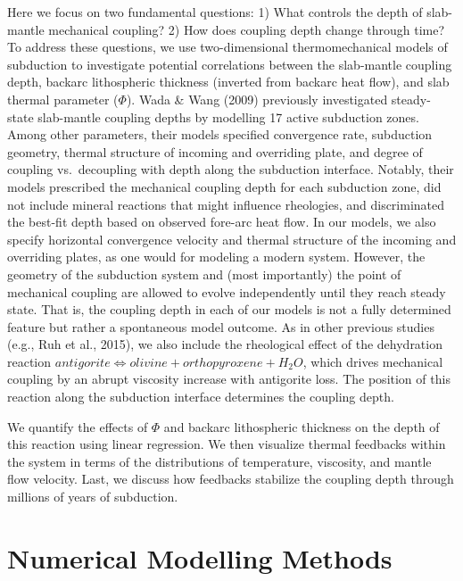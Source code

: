 \documentclass[draft,linenumbers]{agujournal2018}
\begin{document}
Here we focus on two fundamental questions: 1) What controls the depth
of slab-mantle mechanical coupling? 2) How does coupling depth change
through time? To address these questions, we use two-dimensional
thermomechanical models of subduction to investigate potential
correlations between the slab-mantle coupling depth, backarc
lithospheric thickness (inverted from backarc heat flow), and slab
thermal parameter (\(\Phi\)). Wada \& Wang (2009) previously
investigated steady-state slab-mantle coupling depths by modelling 17
active subduction zones. Among other parameters, their models specified
convergence rate, subduction geometry, thermal structure of incoming and
overriding plate, and degree of coupling vs.~decoupling with depth along
the subduction interface. Notably, their models prescribed the
mechanical coupling depth for each subduction zone, did not include
mineral reactions that might influence rheologies, and discriminated the
best-fit depth based on observed fore-arc heat flow. In our models, we
also specify horizontal convergence velocity and thermal structure of
the incoming and overriding plates, as one would for modeling a modern
system. However, the geometry of the subduction system and (most
importantly) the point of mechanical coupling are allowed to evolve
independently until they reach steady state. That is, the coupling depth
in each of our models is not a fully determined feature but rather a
spontaneous model outcome. As in other previous studies (e.g., Ruh et
al., 2015), we also include the rheological effect of the dehydration
reaction
\(antigorite \allowbreak \Leftrightarrow olivine + orthopyroxene + H_{2}O\),
which drives mechanical coupling by an abrupt viscosity increase with
antigorite loss. The position of this reaction along the subduction
interface determines the coupling depth.

We quantify the effects of \(\Phi\) and backarc lithospheric thickness
on the depth of this reaction using linear regression. We then visualize
thermal feedbacks within the system in terms of the distributions of
temperature, viscosity, and mantle flow velocity. Last, we discuss how
feedbacks stabilize the coupling depth through millions of years of
subduction.

\section{Numerical Modelling Methods}
\end{document}
